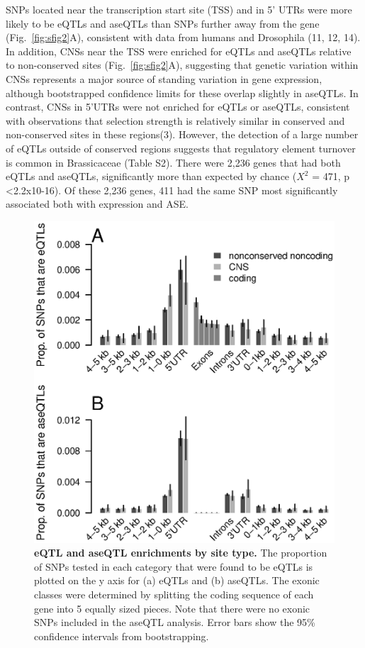 SNPs located near the transcription start site (TSS) and in 5’ UTRs were more likely to be eQTLs and aseQTLs than SNPs further away from the gene (Fig.~\ref{fig:sfig2}A), consistent with data from humans and Drosophila (11, 12, 14). In addition, CNSs near the TSS were enriched for eQTLs and aseQTLs relative to non-conserved sites (Fig.~\ref{fig:sfig2}A), suggesting that genetic variation within CNSs represents a major source of standing variation in gene expression, although bootstrapped confidence limits for these overlap slightly in aseQTLs. In contrast, CNSs in 5’UTRs were not enriched for eQTLs or aseQTLs, consistent with observations that selection strength is relatively similar in conserved and non-conserved sites in these regions(3). However, the detection of a large number of eQTLs outside of conserved regions suggests that regulatory element turnover is common in Brassicaceae (Table S2). There were 2,236 genes that had both eQTLs and aseQTLs, significantly more than expected by chance ($X^{2}$ = 471, p \textless 2.2x10-16). Of these 2,236 genes, 411 had the same SNP most significantly associated both with expression and ASE.

\begin{figure}[h!]
      \centering
       \includegraphics[scale=0.8]{Ch3Fig2}
    \caption{\textbf{eQTL and aseQTL enrichments by site type.} The proportion of SNPs tested in each category that were found to be eQTLs is plotted on the y axis for (a) eQTLs and (b) aseQTLs. The exonic classes were determined by splitting the coding sequence of each gene into 5 equally sized pieces. Note that there were no exonic SNPs included in the aseQTL analysis. Error bars show the 95\% confidence intervals from bootstrapping.}
    \label{fig:3fig2}
\end{figure}

